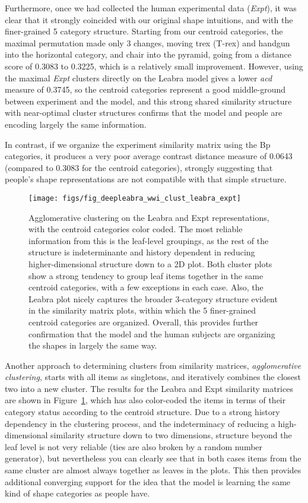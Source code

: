 \documentclass[12pt,twoside]{article}
\newif\myifpdf
\begin{document}
Furthermore, once we had collected the human experimental data ({\em Expt}), it was clear that it strongly coincided with our original shape intuitions, and with the finer-grained 5 category structure.  Starting from our centroid categories, the maximal permutation made only 3 changes, moving trex (T-rex) and handgun into the horizontal category, and chair into the pyramid, going from a distance score of 0.3083 to 0.3225, which is a relatively small improvement.  However, using the maximal {\em Expt} clusters directly on the Leabra model gives a lower {\em acd} measure of 0.3745, so the centroid categories represent a good middle-ground between experiment and the model, and this strong shared similarity structure with near-optimal cluster structures confirms that the model and people are encoding largely the same information.

In contrast, if we organize the experiment similarity matrix using the Bp categories, it produces a very poor average contrast distance measure of 0.0643 (compared to 0.3083 for the centroid categories), strongly suggesting that people's shape representations are not compatible with that simple structure.

\begin{figure}
  \centering\texttt{[image: figs/fig\_deepleabra\_wwi\_clust\_leabra\_expt]}
  \caption{ Agglomerative clustering on the Leabra and Expt representations, with the centroid categories color coded.  The most reliable information from this is the leaf-level groupings, as the rest of the structure is indeterminante and history dependent in reducing higher-dimensional structure down to a 2D plot.  Both cluster plots show a strong tendency to group leaf items together in the same centroid categories, with a few exceptions in each case.  Also, the Leabra plot nicely captures the broader 3-category structure evident in the similarity matrix plots, within which the 5 finer-grained centroid categories are organized.  Overall, this provides further confirmation that the model and the human subjects are organizing the shapes in largely the same way.}
  \label{fig.clust}
\end{figure}

Another approach to determining clusters from similarity matrices, {\em agglomerative clustering}, starts with all items as singletons, and iteratively combines the closest two into a new cluster.  The results for the Leabra and Expt similarity matrices are shown in Figure~\ref{fig.clust}, which has also color-coded the items in terms of their category status according to the centroid structure.  Due to a strong history dependency in the clustering process, and the indeterminacy of reducing a high-dimensional similarity structure down to two dimensions, structure beyond the leaf level is not very reliable (ties are also broken by a random number generator), but nevertheless you can clearly see that in both cases items from the same cluster are almost always together as leaves in the plots.  This then provides additional converging support for the idea that the model is learning the same kind of shape categories as people have.
\end{document}
